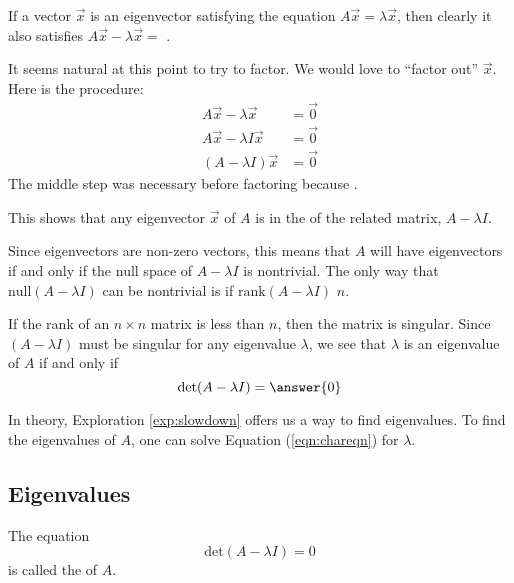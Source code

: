 \documentclass{ximera}
\begin{document}
\begin{exploration}\label{exp:slowdown}
If a vector $\vec{x}$ is an eigenvector satisfying the equation $A\vec{x}=\lambda \vec{x}$, then clearly it also satisfies  $A\vec{x}-\lambda \vec{x} =$ .
    
It seems natural at this point to try to factor.  We would love to ``factor out'' $\vec{x}$.  Here is the procedure:
\begin{align*}
A\vec{x}-\lambda \vec{x} &= \vec{0} \\
A\vec{x}-\lambda I\vec{x} &= \vec{0} \\
(A-\lambda I)\vec{x} &= \vec{0}
\end{align*}
The middle step was necessary before factoring because .
    
This shows that any eigenvector $\vec{x}$ of $A$ is in the   of the related matrix, $A-\lambda I$.
    
Since eigenvectors are non-zero vectors, this means that $A$ will have eigenvectors if and only if the null space of $A-\lambda I$ is nontrivial.  The only way that $\mbox{null}(A-\lambda I)$ can be nontrivial is if $\mbox{rank}(A-\lambda I)$ \wordChoice{\choice{$=$}\choice[correct]{$<$}\choice{$>$}} $n$.
    
If the rank of an $n \times n$ matrix is less than $n$, then the matrix is singular.  Since $(A-\lambda I)$ must be singular for any eigenvalue $\lambda$, we see that $\lambda$ is an eigenvalue of $A$ if and only if
\begin{equation}\label{eqn:chareqn}
\mbox{det}(A-\lambda I) = \answer{0}
\end{equation}
\end{exploration}
In theory, Exploration \ref{exp:slowdown} offers us a way to find eigenvalues.  To find the eigenvalues of $A$, one can solve Equation (\ref{eqn:chareqn}) for $\lambda$.
    
\subsection*{Eigenvalues}
    
\begin{definition}\label{def:chareqcharpoly}
The equation
$$\mbox{det}(A-\lambda I) = 0$$ is called the  of $A$.
\end{definition}
    
\end{document}
